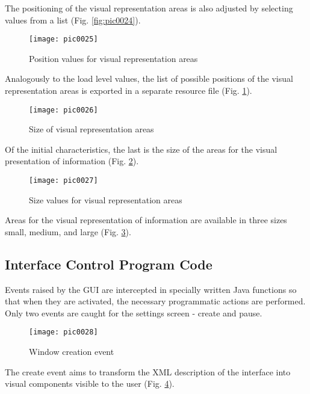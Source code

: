 The positioning of the visual representation areas is also adjusted by selecting values from a list (Fig. \ref{fig:pic0024}).

\begin{figure}[h]
\centering
\texttt{[image: pic0025]}
\caption{Position values for visual representation areas}
\label{fig:pic0025}
\end{figure}
\FloatBarrier

Analogously to the load level values, the list of possible positions of the visual representation areas is exported in a separate resource file (Fig. \ref{fig:pic0025}).

\begin{figure}[h]
\centering
\texttt{[image: pic0026]}
\caption{Size of visual representation areas}
\label{fig:pic0026}
\end{figure}
\FloatBarrier

Of the initial characteristics, the last is the size of the areas for the visual presentation of information (Fig. \ref{fig:pic0026}).

\begin{figure}[h]
\centering
\texttt{[image: pic0027]}
\caption{Size values for visual representation areas}
\label{fig:pic0027}
\end{figure}
\FloatBarrier

Areas for the visual representation of information are available in three sizes small, medium, and large (Fig. \ref{fig:pic0027}).

\subsection{Interface Control Program Code}

Events raised by the GUI are intercepted in specially written Java functions so that when they are activated, the necessary programmatic actions are performed. Only two events are caught for the settings screen - create and pause.

\begin{figure}[h]
\centering
\texttt{[image: pic0028]}
\caption{Window creation event}
\label{fig:pic0028}
\end{figure}
\FloatBarrier

The create event aims to transform the XML description of the interface into visual components visible to the user (Fig. \ref{fig:pic0028}).

